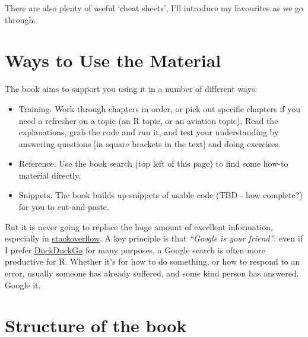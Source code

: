 \documentclass[
]{book}
\providecommand{\tightlist}{%
  \setlength{\itemsep}{0pt}\setlength{\parskip}{0pt}}
\begin{document}
There are also plenty of useful `cheat sheets', I'll introduce my favourites as we go through.

\hypertarget{ways-to-use-the-material}{%
\section{Ways to Use the Material}\label{ways-to-use-the-material}}

The book aims to support you using it in a number of different ways:

\begin{itemize}
\tightlist
\item
  Training. Work through chapters in order, or pick out specific chapters if you need a refresher on a topic (an R topic, or an aviation topic). Read the explanations, grab the code and run it, and test your understanding by answering questions {[}in square brackets in the text{]} and doing exercises.
\item
  Reference. Use the book search (top left of this page) to find some how-to material directly.
\item
  Snippets. The book builds up snippets of usable code (TBD - how complete?) for you to cut-and-paste.
\end{itemize}

But it is never going to replace the huge amount of excellent information, especially in \href{https://stackoverflow.com/}{stackoverflow}. A key principle is that \emph{``Google is your friend''}: even if I prefer \href{https://www.duckduckgo.com}{DuckDuckGo} for many purposes, a Google search is often more productive for R. Whether it's for how to do something, or how to respond to an error, usually someone has already suffered, and some kind person has answered. Google it.

\hypertarget{structure-of-the-book}{%
\section{Structure of the book}\label{structure-of-the-book}}
\end{document}
